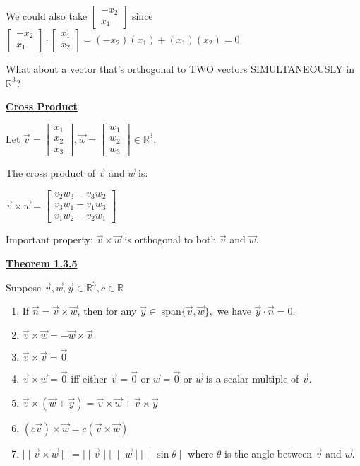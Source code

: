 \documentclass{letter}
\newcommand{\0}[1]{\begin{bmatrix}#1\end{bmatrix}}
\newcommand{\h}[1]{\underline{\textbf{#1}}}
\begin{document}
	We could also take $\0{-x_2\\x_1}$ since $\0{-x_2\\x_1} \cdot \0{x_1\\x_2} = (-x_2)(x_1) + (x_1)(x_2) = 0$
	
	What about a vector that's orthogonal to TWO vectors SIMULTANEOUSLY in $\mathbb{R}^3$?
	
	\h{Cross Product}
	
	Let $\vec v = \0{x_1\\x_2\\x_3}, \vec w = \0{w_1\\w_2\\w_3} \in \mathbb{R}^3$.
	
	The cross product of $\vec v$ and $\vec w$ is:
	
	$\vec v \times \vec w = \0{v_2w_3 - v_3w_2\\v_3w_1 - v_1w_3\\v_1w_2-v_2w_1}$
	
	Important property: $\vec v \times \vec w$ is orthogonal to both $\vec v$ and $\vec w$.
	
	\clearpage
	
	\h{Theorem 1.3.5}
	
	Suppose $\vec v, \vec w, \vec y \in \mathbb{R}^3, c \in \mathbb{R}$
	
	\begin{enumerate}[1)]
		\item If $\vec n = \vec v \times \vec w$, then for any $\vec y \in\; $span$\{ \vec v, \vec w \},$ we have $\vec y \cdot \vec n = 0$.
		\item $\vec v \times \vec w = -\vec w \times \vec v$
		\item $\vec v \times \vec v = \vec 0$
		\item $\vec v \times \vec w = \vec 0$ iff either $\vec v = \vec 0$ or $\vec w = \vec 0$ or $\vec w$ is a scalar multiple of $\vec v$.
		\item $\vec v \times (\vec w + \vec y) = \vec v \times \vec w + \vec v \times \vec y$
		\item $(c \vec v) \times \vec w = c(\vec v \times \vec w)$
		\item $\mid \mid \vec v \times \vec w \mid \mid = \mid \mid \vec v \mid \mid \; \mid\mid\vec w\mid\mid\;\mid \sin \theta \mid$ where $\theta$ is the angle between $\vec v$ and $\vec w$.
	\end{enumerate}
\end{document}
